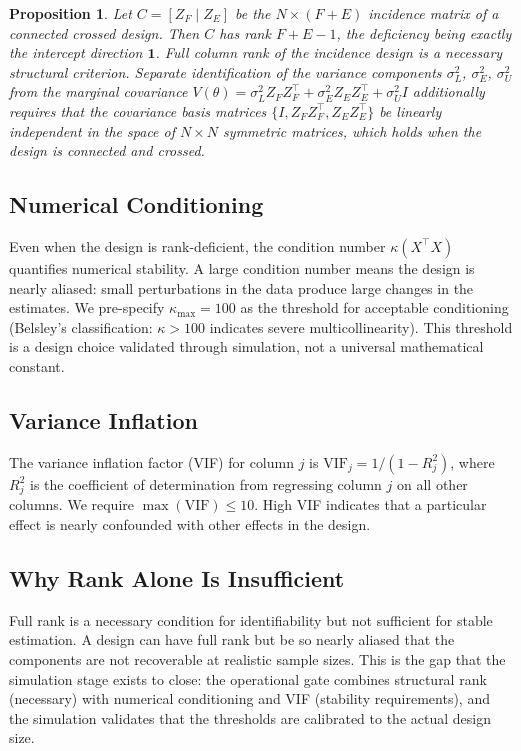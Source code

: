 \documentclass[journal]{IEEEtran}
\newtheorem{proposition}{Proposition}
\begin{document}
\begin{proposition}
\label{prop:rank}
Let $C = [Z_F \mid Z_E]$ be the $N \times (F + E)$ incidence matrix of a connected crossed design. Then $C$ has rank $F + E - 1$, the deficiency being exactly the intercept direction $\mathbf{1}$. Full column rank of the incidence design is a necessary structural criterion. Separate identification of the variance components $\sigma^2_L$, $\sigma^2_E$, $\sigma^2_U$ from the marginal covariance $V(\theta) = \sigma^2_L Z_F Z_F^\top + \sigma^2_E Z_E Z_E^\top + \sigma^2_U I$ additionally requires that the covariance basis matrices $\{I, Z_F Z_F^\top, Z_E Z_E^\top\}$ be linearly independent in the space of $N \times N$ symmetric matrices, which holds when the design is connected and crossed.
\end{proposition}

\subsection{Numerical Conditioning}

Even when the design is rank-deficient, the condition number $\kappa(X^\top X)$ quantifies numerical stability. A large condition number means the design is nearly aliased: small perturbations in the data produce large changes in the estimates. We pre-specify $\kappa_{\max} = 100$ as the threshold for acceptable conditioning (Belsley's classification: $\kappa > 100$ indicates severe multicollinearity). This threshold is a design choice validated through simulation, not a universal mathematical constant.

\subsection{Variance Inflation}

The variance inflation factor (VIF) for column $j$ is $\text{VIF}_j = 1/(1 - R^2_j)$, where $R^2_j$ is the coefficient of determination from regressing column $j$ on all other columns. We require $\max(\text{VIF}) \leq 10$. High VIF indicates that a particular effect is nearly confounded with other effects in the design.

\subsection{Why Rank Alone Is Insufficient}

Full rank is a necessary condition for identifiability but not sufficient for stable estimation. A design can have full rank but be so nearly aliased that the components are not recoverable at realistic sample sizes. This is the gap that the simulation stage exists to close: the operational gate combines structural rank (necessary) with numerical conditioning and VIF (stability requirements), and the simulation validates that the thresholds are calibrated to the actual design size.
\end{document}
